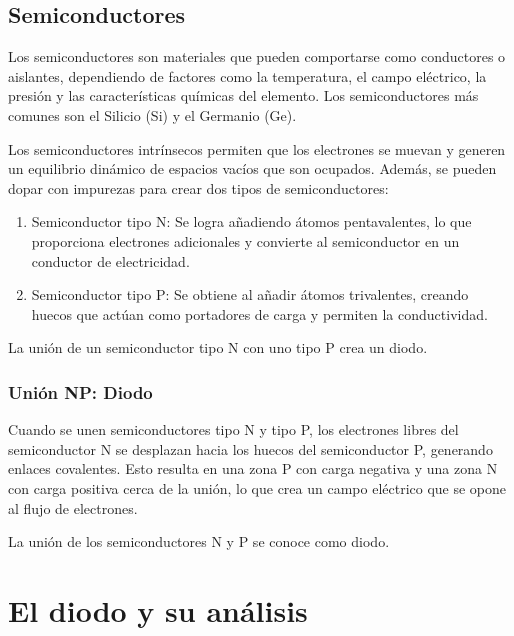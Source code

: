 \documentclass[11pt,fancy,lang=es]{elegantbook}
\begin{document}
\subsection{Semiconductores}

Los semiconductores son materiales que pueden comportarse como conductores o aislantes, dependiendo de factores como la temperatura, el campo eléctrico, la presión y las características químicas del elemento. Los semiconductores más comunes son el Silicio (Si) y el Germanio (Ge).

Los semiconductores intrínsecos permiten que los electrones se muevan y generen un equilibrio dinámico de espacios vacíos que son ocupados. Además, se pueden dopar con impurezas para crear dos tipos de semiconductores:

\begin{enumerate}
    \item Semiconductor tipo N: Se logra añadiendo átomos pentavalentes, lo que proporciona electrones adicionales y convierte al semiconductor en un conductor de electricidad.
    \item Semiconductor tipo P: Se obtiene al añadir átomos trivalentes, creando huecos que actúan como portadores de carga y permiten la conductividad.
\end{enumerate}

La unión de un semiconductor tipo N con uno tipo P crea un diodo.

\subsubsection{Unión NP: Diodo}

Cuando se unen semiconductores tipo N y tipo P, los electrones libres del semiconductor N se desplazan hacia los huecos del semiconductor P, generando enlaces covalentes. Esto resulta en una zona P con carga negativa y una zona N con carga positiva cerca de la unión, lo que crea un campo eléctrico que se opone al flujo de electrones.




La unión de los semiconductores N y P se conoce como diodo.


\section{El diodo y su análisis}
\end{document}

